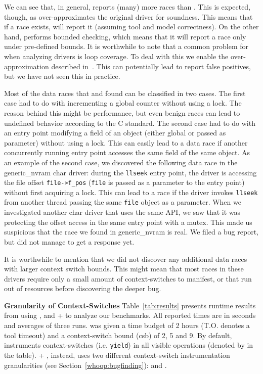 We can see that, in general, \whoop reports (many) more races than \corral. This is expected, though, as \whoop over-approximates the original driver for soundness. This means that if a race exists, \whoop will report it (assuming tool and model correctness). On the other hand, \corral performs bounded checking, which means that it will report a race only under pre-defined bounds. It is worthwhile to note that a common problem for \corral when analyzing drivers is loop coverage. To deal with this we enable the over-approximation described in~\cite{lal2014powering}. This can potentially lead \corral to report false positives, but we have not seen this in practice.

Most of the data races that \whoop and \corral found can be classified in two cases. The first case had to do with incrementing a global counter without using a lock. The reason behind this might be performance, but even benign races can lead to undefined behavior according to the C standard. The second case had to do with an entry point modifying a field of an object (either global or passed as parameter) without using a lock. This can easily lead to a data race if another concurrently running entry point accesses the same field of the same object. As an example of the second case, we discovered the following data race in the generic\_nvram char driver: during the \texttt{llseek} entry point, the driver is accessing the file offset \texttt{file->f\_pos} (\texttt{file} is passed as a parameter to the entry point) without first acquiring a lock. This can lead to a race if the driver invokes \texttt{llseek} from another thread passing the same \texttt{file} object as a parameter. When we investigated another char driver that uses the same API, we saw that it was protecting the offset access in the same entry point with a mutex. This made us suspicious that the race we found in generic\_nvram is real. We filed a bug report, but did not manage to get a response yet.

It is worthwhile to mention that we did not discover any additional data races with larger context switch bounds. This might mean that most races in these drivers require only a small amount of context-switches to manifest, or that \corral run out of resources before discovering the deeper bug.

\noindent
\textbf{Granularity of Context-Switches}\xspace\xspace Table~\ref{tab:results} presents runtime results from using \whoop, \corral and \whoop + \corral to analyze our benchmarks. All reported times are in seconds and averages of three runs. \corral was given a time budget of 2 hours (T.O. denotes a tool timeout) and a context-switch bound (csb) of 2, 5 and 9. By default, \corral instruments context-switches (i.e. \texttt{yield}) in all visible operations (denoted by \yieldall in the table). \whoop + \corral, instead, uses two different context-switch instrumentation granularities (see Section~\ref{whoop:bugfinding}): \yieldcoarse and \yieldmr.

